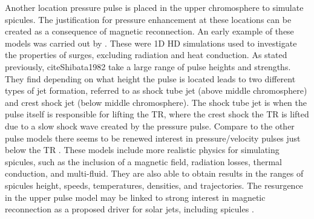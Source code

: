 \documentclass[12pt]{ociamthesis}
\begin{document}
Another location pressure pulse is placed in the upper chromosphere to simulate spicules. The justification for pressure enhancement at these locations can be created as a consequence of magnetic reconnection. An early example of these models was carried out by \cite{Shibata1982}. These were 1D HD simulations used to investigate the properties of surges, excluding radiation and heat conduction. As stated previously, cite{Shibata1982} take a large range of pulse heights and strengths. They find depending on what height the pulse is located leads to two different types of jet formation, referred to as shock tube jet (above middle chromosphere) and crest shock jet (below middle chromosphere). The shock tube jet is when the pulse itself is responsible for lifting the TR, where the crest shock the TR is lifted due to a slow shock wave created by the pressure pulse. Compare to the other pulse models there seems to be renewed interest in pressure/velocity pulses just below the TR \citep{Murawski2010AA519A8M, Smirnova2016SoPh2913207S, Kuzma2017AA597A133K, kuzma2017ApJ84978K, Singh2019}. These models include more realistic physics for simulating spicules, such as the inclusion of a magnetic field, radiation losses, thermal conduction, and multi-fluid. They are also able to obtain results in the ranges of spicules height, speeds, temperatures, densities, and trajectories. The resurgence in the upper pulse model may be linked to strong interest in magnetic reconnection as a proposed driver for solar jets, including spicules \citep{Yokoyama1995Natur37542Y, Yokoyama1996PASJ48353Y, Pontieu2007PASJ, Gonz2017ApJ, Gonz2018ApJ856176G}.
\end{document}
